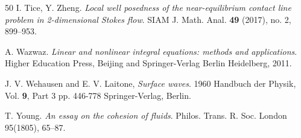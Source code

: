 \documentclass[letterpaper,reqno,10pt,twoside]{amsart}
\theoremstyle{definition}
\theoremstyle{remark}
\begin{document}
\begin{thebibliography}{50}
			 I. Tice, Y. Zheng. {\it Local well posedness of the near-equilibrium contact line problem in 2-dimensional Stokes flow}. SIAM J. Math. Anal. {\bf 49 } (2017), no. 2, 899--953.
			
			 A. Wazwaz. {\em Linear and nonlinear integral equations: methods and applications}. Higher Education Press, Beijing and Springer-Verlag Berlin Heidelberg, 2011.
			
			 J. V. Wehausen and E. V. Laitone, {\it Surface waves}. 1960 Handbuch der Physik, Vol. {\bf 9}, Part 3 pp. 446-778 Springer-Verlag, Berlin.
			
			 T. Young. {\em An essay on the cohesion of fluids}. Philos. Trans. R. Soc. London 95(1805), 65--87.
			
		\end{thebibliography}
		
		
	
\end{document}
